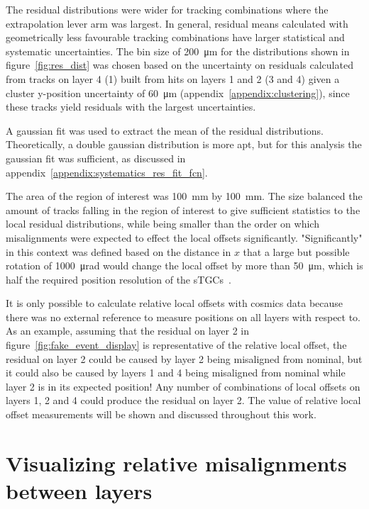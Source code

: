 The residual distributions were wider for tracking combinations where the extrapolation lever arm was largest. In general, residual means calculated with geometrically less favourable tracking combinations have larger statistical and systematic uncertainties. The bin size of \SI{200}{\micro\meter} for the distributions shown in figure~\ref{fig:res_dist} was chosen based on the uncertainty on residuals calculated from tracks on layer 4 (1) built from hits on layers 1 and 2 (3 and 4) given a cluster y-position uncertainty of \SI{60}{\micro\meter} (appendix~\ref{appendix:clustering}), since these tracks yield residuals with the largest uncertainties.

A gaussian fit was used to extract the mean of the residual distributions. Theoretically, a double gaussian distribution is more apt, but for this analysis the gaussian fit was sufficient, as discussed in appendix~\ref{appendix:systematics_res_fit_fcn}.

The area of the region of interest was \SI{100}{\milli\meter} by \SI{100}{\milli\meter}. The size balanced the amount of tracks falling in the region of interest to give sufficient statistics to the local residual distributions, while being smaller than the order on which misalignments were expected to effect the local offsets significantly. "Significantly" in this context was defined based on the distance in $x$ that a large but possible rotation of \SI{1000}{\micro\radian} would change the local offset by more than \SI{50}{\micro\meter}, which is half the required position resolution of the sTGCs~\cite{nsw_tdr}.

It is only possible to calculate relative local offsets with cosmics data because there was no external reference to measure positions on all layers with respect to. As an example, assuming that the residual on layer 2 in figure~\ref{fig:fake_event_display} is representative of the relative local offset, the residual on layer 2 could be caused by layer 2 being misaligned from nominal, but it could also be caused by layers 1 and 4 being misaligned from nominal while layer 2 is in its expected position! Any number of combinations of local offsets on layers 1, 2 and 4 could produce the residual on layer 2. The value of relative local offset measurements will be shown and discussed throughout this work.

\section{Visualizing relative misalignments between layers}

